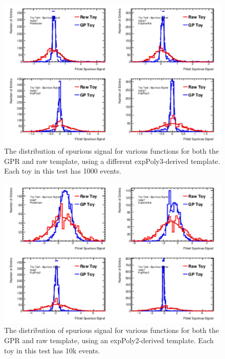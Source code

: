\begin{figure} 
\begin{center}
  \includegraphics[width=\textwidth]{figures/background/gpr/validation/nominal/ToyTest_FitSigVals_highpT_1000_noSig}   
\caption{The distribution of spurious signal for various functions for both the GPR and raw template, using a different expPoly3-derived template. Each toy in this test has 1000 events.}
\label{fig:highpt_1000_noSig}
\end{center}
\end{figure}

\begin{figure} 
\begin{center}
  \includegraphics[width=\textwidth]{figures/background/gpr/validation/nominal/ToyTest_FitSigVals_lowpT_10k_noSig}   
\caption{The distribution of spurious signal for various functions for both the GPR and raw template, using an expPoly2-derived template. Each toy in this test has 10k events.}
\label{fig:lowpt_10k_noSig}
\end{center}
\end{figure}

